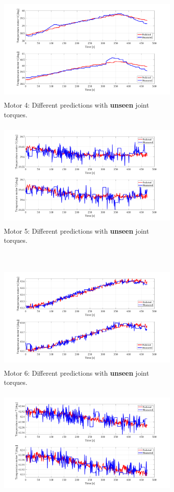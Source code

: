 \documentclass{ifacconf}
\begin{document}
\begin{figure}[t!]
\begin{subfigure}[t]{\columnwidth}
		\includegraphics[height=2.1in]{./pictures/applications/J4o.png}
		\caption{Motor 4: Different predictions with \textbf{unseen} joint torques.}
	\end{subfigure}
	\begin{subfigure}[t]{\columnwidth}
		\includegraphics[height=2.1in]{./pictures/applications/J5o.png}
		\caption{Motor 5: Different predictions with \textbf{unseen} joint torques.}
	\end{subfigure}%
	~ 
	\begin{subfigure}[t]{\columnwidth}
		\includegraphics[height=2.1in]{./pictures/applications/J6o.png}
		\caption{Motor 6: Different predictions with \textbf{unseen} joint torques.}
	\end{subfigure}
	\begin{subfigure}[t]{\columnwidth}
		\includegraphics[height=2.1in]{./pictures/applications/J7o.png}

\end{subfigure}
\end{figure}
\end{document}
